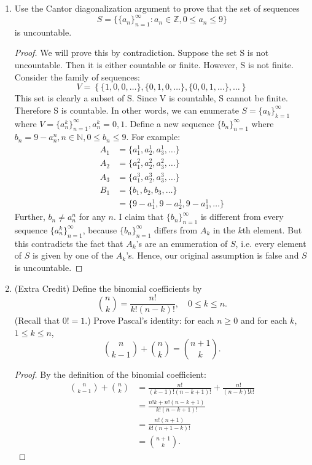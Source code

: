 \documentclass[12pt]{amsart}
\begin{document}
\begin{enumerate}
\item Use the Cantor diagonalization argument to prove that the set of
  sequences 
%
\[ S=\big\{ \{a_n\}_{n=1}^\infty : a_n\in \mathbb{Z}, 0\leq a_n \leq 9
  \big\} \]
%
is uncountable.

\begin{proof}
We will prove this by contradiction. Suppose the set S is not uncountable. Then it is either countable or finite. However, S is not finite.
Consider the family of sequences:
\[ V = \left\{ \{1,0,0,\ldots\}, \{0,1,0,\ldots\}, \{0,0,1,\ldots\}, \ldots \right\} \]
This set is clearly a subset of S. Since V is countable, S cannot be finite.
Therefore S is countable. In other words, we can enumerate $S=\{a_k\}^\infty_{k=1}$ where $V=\{a^k_n\}^\infty_{n=1}, a^k_n=0,1$.
Define a new sequence $\{b_n\}^\infty_{n=1}$ where $b_n = 9 - a^n_n, n\in\mathbb N, 0\leq b_n \leq 9$. For example:
\begin{align*}
A_1 &= \{a^1_1, a^1_2, a^1_3, \ldots \} \\
A_2 &= \{a^2_1, a^2_2, a^2_3, \ldots \} \\
A_3 &= \{a^3_1, a^3_2, a^3_3, \ldots \} \\
B_1 &= \{b_1, b_2, b_3, \ldots \} \\
&= \{9-a^1_1, 9-a^1_2, 9-a^1_3, \ldots \}
\end{align*}
Further, $b_n \ne a^n_n$ for any $n$. I claim that $\{b_n\}^\infty_{n=1}$ is different from every sequence $\{a^k_n\}^\infty_{n=1}$, because $\{b_n\}^\infty_{n=1}$ differs from $A_k$ in the $k$th element. But this contradicts the fact that $A_k$'s are an enumeration of $S$, i.e. every element of $S$ is given by one of the $A_k$'s. Hence, our original assumption is false and $S$ is uncountable.
\end{proof}

\addtocounter{enumi}{1}

\item   (Extra Credit) Define the binomial coefficients by
%
\[ \binom{n}{k} = \frac{n!}{k!(n-k)!}, \quad 0\leq k \leq n. \]
%
(Recall that $0!=1$.)  Prove Pascal's identity:  for each $n\geq 0$ and for each $k$,
$1\leq k \leq n$, 
%
\[ \binom{n}{k-1}+\binom{n}{k} = \binom{n+1}{k}. \]
%

\begin{proof}
By the definition of the binomial coefficient:
\begin{align*}
\binom{n}{k-1}+\binom{n}{k}& = \frac{n!}{(k-1)!(n-k+1)!} + \frac{n!}{(n-k)!k!} \\
& = \frac{n!k+n!(n-k+1)}{k!(n-k+1)!} \\
& = \frac{n!(n+1)}{k!(n+1-k)!} \\
& = \binom{n+1}{k}.
\end{align*}
\end{proof}


\end{enumerate}
\end{document}
